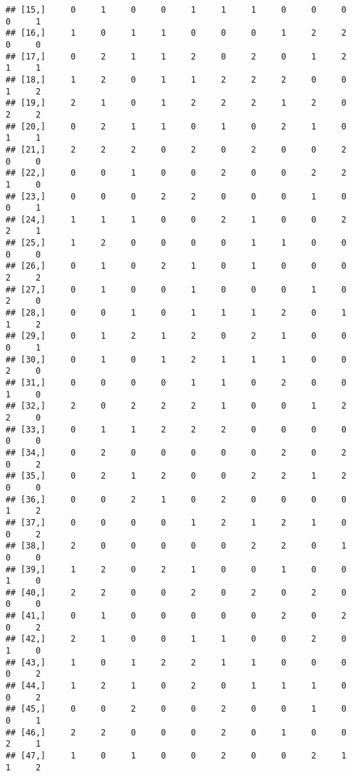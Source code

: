 \documentclass[
]{article}
\begin{document}
\begin{verbatim}
## [15,]     0     1     0     0     1     1     1     0     0     0     0     1
## [16,]     1     0     1     1     0     0     0     1     2     2     0     0
## [17,]     0     2     1     1     2     0     2     0     1     2     1     1
## [18,]     1     2     0     1     1     2     2     2     0     0     1     2
## [19,]     2     1     0     1     2     2     2     1     2     0     2     2
## [20,]     0     2     1     1     0     1     0     2     1     0     1     1
## [21,]     2     2     2     0     2     0     2     0     0     2     0     0
## [22,]     0     0     1     0     0     2     0     0     2     2     1     0
## [23,]     0     0     0     2     2     0     0     0     1     0     0     1
## [24,]     1     1     1     0     0     2     1     0     0     2     2     1
## [25,]     1     2     0     0     0     0     1     1     0     0     0     0
## [26,]     0     1     0     2     1     0     1     0     0     0     2     2
## [27,]     0     1     0     0     1     0     0     0     1     0     2     0
## [28,]     0     0     1     0     1     1     1     2     0     1     1     2
## [29,]     0     1     2     1     2     0     2     1     0     0     0     1
## [30,]     0     1     0     1     2     1     1     1     0     0     2     0
## [31,]     0     0     0     0     1     1     0     2     0     0     1     0
## [32,]     2     0     2     2     2     1     0     0     1     2     2     0
## [33,]     0     1     1     2     2     2     0     0     0     0     0     0
## [34,]     0     2     0     0     0     0     0     2     0     2     0     2
## [35,]     0     2     1     2     0     0     2     2     1     2     0     0
## [36,]     0     0     2     1     0     2     0     0     0     0     1     2
## [37,]     0     0     0     0     1     2     1     2     1     0     0     2
## [38,]     2     0     0     0     0     0     2     2     0     1     0     0
## [39,]     1     2     0     2     1     0     0     1     0     0     1     0
## [40,]     2     2     0     0     2     0     2     0     2     0     0     0
## [41,]     0     1     0     0     0     0     0     2     0     2     0     2
## [42,]     2     1     0     0     1     1     0     0     2     0     1     0
## [43,]     1     0     1     2     2     1     1     0     0     0     0     2
## [44,]     1     2     1     0     2     0     1     1     1     0     0     2
## [45,]     0     0     2     0     0     2     0     0     1     0     0     1
## [46,]     2     2     0     0     0     2     0     1     0     0     2     1
## [47,]     1     0     1     0     0     2     0     0     2     1     1     2

\end{verbatim}
\end{document}

